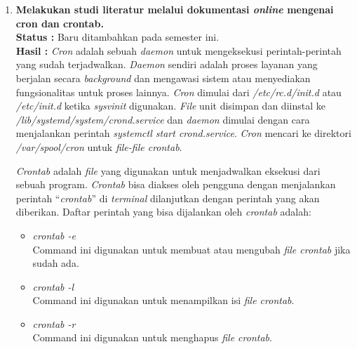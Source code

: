\documentclass[a4paper,twoside]{article}
\begin{document}
\begin{enumerate}
		\item \textbf{Melakukan studi literatur melalui dokumentasi \textit{online} mengenai cron dan crontab.}\\
		{\bf Status :} Baru ditambahkan pada semester ini.\\
		{\bf Hasil :} \textit{Cron} adalah sebuah \textit{daemon} untuk mengeksekusi perintah-perintah yang sudah terjadwalkan. \textit{Daemon} sendiri adalah proses layanan yang berjalan secara \textit{background} dan mengawasi sistem atau menyediakan fungsionalitas untuk proses lainnya. \textit{Cron} dimulai dari \textit{/etc/rc.d/init.d} atau \textit{/etc/init.d} ketika \textit{sysvinit} digunakan. \textit{File} unit disimpan dan diinstal ke \textit{/lib/systemd/system/crond.service} dan \textit{daemon} dimulai dengan cara menjalankan perintah \textit{systemctl start crond.service}. \textit{Cron} mencari ke direktori \textit{/var/spool/cron} untuk \textit{file-file crontab}. 

\textit{Crontab} adalah \textit{file} yang digunakan untuk menjadwalkan eksekusi dari sebuah program. \textit{Crontab} bisa diakses oleh pengguna dengan menjalankan perintah ``\textit{crontab}'' di \textit{terminal} dilanjutkan dengan perintah yang akan diberikan. Daftar perintah yang bisa dijalankan oleh \textit{crontab} adalah:
\begin{itemize}
	\item \textit{crontab -e}\\
	Command ini digunakan untuk membuat atau mengubah \textit{file crontab} jika sudah ada. 
	\item \textit{crontab -l}\\
	Command ini digunakan untuk menampilkan isi \textit{file crontab}.
	\item \textit{crontab -r}\\
	Command ini digunakan untuk menghapus \textit{file crontab}.
\end{itemize}


\end{enumerate}
\end{document}
